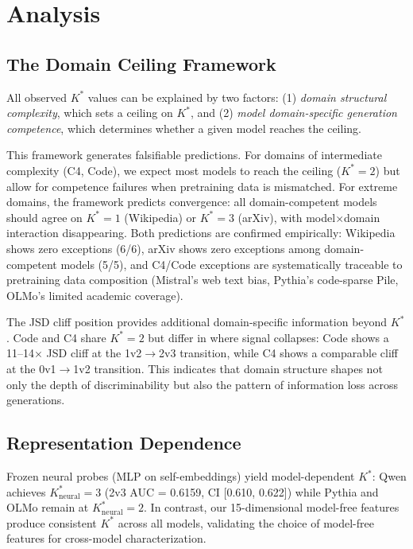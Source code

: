 \documentclass[11pt,a4paper]{article}
\newcommand{\kstar}{K^{*}}
\begin{document}
\section{Analysis}

\subsection{The Domain Ceiling Framework}
\label{sec:domain_ceiling}

All observed $\kstar$ values can be explained by two factors:
(1) \emph{domain structural complexity}, which sets a ceiling on $\kstar$, and
(2) \emph{model domain-specific generation competence}, which determines whether a given model reaches the ceiling.

This framework generates falsifiable predictions.
For domains of intermediate complexity (C4, Code), we expect most models to reach the ceiling ($\kstar\!=\!2$) but allow for competence failures when pretraining data is mismatched.
For extreme domains, the framework predicts convergence: all domain-competent models should agree on $\kstar\!=\!1$ (Wikipedia) or $\kstar\!=\!3$ (arXiv), with model$\times$domain interaction disappearing.
Both predictions are confirmed empirically: Wikipedia shows zero exceptions (6/6), arXiv shows zero exceptions among domain-competent models (5/5), and C4/Code exceptions are systematically traceable to pretraining data composition (Mistral's web text bias, Pythia's code-sparse Pile, OLMo's limited academic coverage).

The JSD cliff position provides additional domain-specific information beyond $\kstar$.
Code and C4 share $\kstar\!=\!2$ but differ in where signal collapses: Code shows a 11--14$\times$ JSD cliff at the 1v2$\to$2v3 transition, while C4 shows a comparable cliff at the 0v1$\to$1v2 transition.
This indicates that domain structure shapes not only the depth of discriminability but also the pattern of information loss across generations.

\subsection{Representation Dependence}

Frozen neural probes (MLP on self-embeddings) yield model-dependent $\kstar$: Qwen achieves $\kstar_{\mathrm{neural}}\!=\!3$ (2v3 AUC = 0.6159, CI [0.610, 0.622]) while Pythia and OLMo remain at $\kstar_{\mathrm{neural}}\!=\!2$.
In contrast, our 15-dimensional model-free features produce consistent $\kstar$ across all models, validating the choice of model-free features for cross-model characterization.
\end{document}
